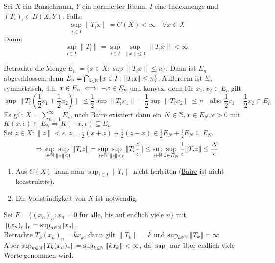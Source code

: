 \begin{satz} \label{satz:9.5-Banach-Steinhaus} 
	Sei $X$ ein Banachraum, $Y$ ein normierter Raum, $I$ eine Indexmenge und $(T_{i})_{i} \in B(X, Y)$.
	Falls: 
	\[ \sup_{i \in I} \| T_{i} x \| = C(X) < \infty \quad \forall x \in X \]
	Dann:
	\[ \sup_{i \in I} \| T_{i} \| = \sup_{i \in I} \sup_{\| x \| \leq 1} \| T_{i} x \| < \infty. \]
\end{satz}

\begin{beweis}
	Betrachte die Menge $E_{n} \coloneqq \{ x \in X: \sup \| T_{i} x \| \leq n\}$. Dann ist $E_{n}$ abgeschlossen, denn $E_{n} = \bigcap_{i \in \mathbb{N}} \{ x \in I: \| T_{i} x \| \leq n \}$. Außerdem ist $E_{n}$ symmetrisch, d.h. $x \in E_{n} \iff -x \in E_{n}$ und konvex, denn für $x_{1}, x_{2} \in E_{n}$ gilt
		\[ \sup \| T_{i} \left( \frac{1}{2} x_{1} + \frac{1}{2} x_{2} \right) \| \leq \frac{1}{2} \sup \| T_{i} x_{1} \| + \frac{1}{2} \sup \| T_{i} x_{2} \| \leq n \quad \text{also } \frac{1}{2} x_{1} + \frac{1}{2} x_{2} \in E_{n} \]
		Es gilt $X = \sum_{n = 1}^{\infty} E_{n}$, nach \hyperref[satz:9.1-baire]{Baire} existiert dann ein $N \in \mathbb{N}, x \in E_{N}, \epsilon > 0$ mit $K(x, \epsilon) \subset E_{N} \Rightarrow K(-x, \epsilon) \subseteq E_{n}$ \\
		Sei $z \in X: \| z \| < \epsilon$. $z = \frac{1}{2} (x + z) + \frac{1}{2} (z - x) \in \frac{1}{2} E_{N} + \frac{1}{2} E_{N} \subseteq E_{N}$. 
		\[ \Rightarrow \sup_{i \in \mathbb{N}} \sup_{\| z \| \leq 1} \| T_{i} z \| = \sup_{i \in \mathbb{N}} \sup_{\| z \| < \epsilon} \| T_{i} \frac{z}{\epsilon} \| \leq \sup_{i \in \mathbb{N}} \sup_{z \in E_{N}} \frac{1}{\epsilon} \| T_{i} z \| \leq \frac{N}{\epsilon} \]	
\end{beweis}


\begin{bemerkung}  \label{bem:9.6}
	\begin{enumerate}[label=\alph*\upshape)]
		\item Aus $C(X)$ kann man $\sup_{i \in I} \| T_{i} \|$ nicht herleiten (\hyperref[satz:9.3-KategoriensatzVonBaire]{Baire} ist nicht konstruktiv).
		\item Die Vollständigkeit von $X$ ist notwendig.
	\end{enumerate}	
\end{bemerkung}


\begin{beispiel*}
Sei $F = \{ (x_{n})_{n}: x_{n} = 0$ für alle, bis auf endlich viele $n \}$ mit $\| (x_{n})_{n} \|_{p} = \sup_{n \in \mathbb{N}} | x_{n} |$. \\
Betrachte $T_{k} (x_{n})_{n} = k x_{k}$, dann gilt $\| T_{k} \| = k$ und $\sup_{k \in \mathbb{N}} \| T_{k} \| = \infty$ \\
Aber $\sup_{k \in \mathbb{N}} \| T_{k} (x_{n})_{n} \| = \sup_{k \in \mathbb{N}} \| k x_{k} \| < \infty$, da $\sup$ nur über endlich viele Werte genommen wird.
\end{beispiel*}



